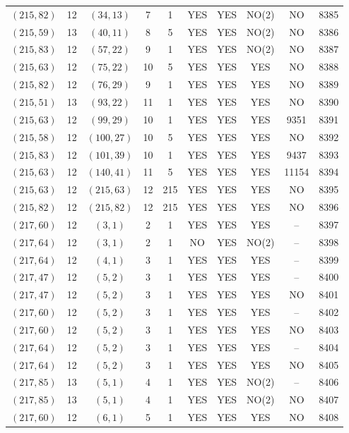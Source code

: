 \begin{longtable}{|c|c|c|c|c|c|c|c|c|c|}
$(215, 82)$ & 12 & $(34, 13)$ & 7 & 1 & YES & YES & NO(2) & NO & 8385\\
$(215, 59)$ & 13 & $(40, 11)$ & 8 & 5 & YES & YES & NO(2) & NO & 8386\\
$(215, 83)$ & 12 & $(57, 22)$ & 9 & 1 & YES & YES & NO(2) & NO & 8387\\
$(215, 63)$ & 12 & $(75, 22)$ & 10 & 5 & YES & YES & YES & NO & 8388\\
$(215, 82)$ & 12 & $(76, 29)$ & 9 & 1 & YES & YES & YES & NO & 8389\\
$(215, 51)$ & 13 & $(93, 22)$ & 11 & 1 & YES & YES & YES & NO & 8390\\
$(215, 63)$ & 12 & $(99, 29)$ & 10 & 1 & YES & YES & YES & 9351 & 8391\\
$(215, 58)$ & 12 & $(100, 27)$ & 10 & 5 & YES & YES & YES & NO & 8392\\
$(215, 83)$ & 12 & $(101, 39)$ & 10 & 1 & YES & YES & YES & 9437 & 8393\\
$(215, 63)$ & 12 & $(140, 41)$ & 11 & 5 & YES & YES & YES & 11154 & 8394\\
$(215, 63)$ & 12 & $(215, 63)$ & 12 & 215 & YES & YES & YES & NO & 8395\\
$(215, 82)$ & 12 & $(215, 82)$ & 12 & 215 & YES & YES & YES & NO & 8396\\
$(217, 60)$ & 12 & $(3, 1)$ & 2 & 1 & YES & YES & YES & -- & 8397\\
$(217, 64)$ & 12 & $(3, 1)$ & 2 & 1 & NO & YES & NO(2) & -- & 8398\\
$(217, 64)$ & 12 & $(4, 1)$ & 3 & 1 & YES & YES & YES & -- & 8399\\
$(217, 47)$ & 12 & $(5, 2)$ & 3 & 1 & YES & YES & YES & -- & 8400\\
$(217, 47)$ & 12 & $(5, 2)$ & 3 & 1 & YES & YES & YES & NO & 8401\\
$(217, 60)$ & 12 & $(5, 2)$ & 3 & 1 & YES & YES & YES & -- & 8402\\
$(217, 60)$ & 12 & $(5, 2)$ & 3 & 1 & YES & YES & YES & NO & 8403\\
$(217, 64)$ & 12 & $(5, 2)$ & 3 & 1 & YES & YES & YES & -- & 8404\\
$(217, 64)$ & 12 & $(5, 2)$ & 3 & 1 & YES & YES & YES & NO & 8405\\
$(217, 85)$ & 13 & $(5, 1)$ & 4 & 1 & YES & YES & NO(2) & -- & 8406\\
$(217, 85)$ & 13 & $(5, 1)$ & 4 & 1 & YES & YES & NO(2) & NO & 8407\\
$(217, 60)$ & 12 & $(6, 1)$ & 5 & 1 & YES & YES & YES & NO & 8408\\

\end{longtable}
